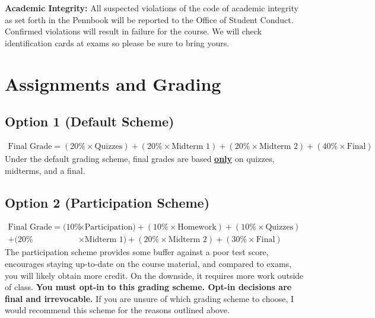 \documentclass[11pt, letterpaper]{article}
\begin{document}
\bigskip

\noindent \textbf{Academic Integrity: } 
All suspected violations of the code of academic integrity as set forth in the Pennbook will be reported to the Office of Student Conduct. 
Confirmed violations will result in failure for the course. 
We will check identification cards at exams so please be sure to bring yours.

\medskip

\section*{Assignments and Grading}
	\subsection*{Option 1 (Default Scheme)}
		\begin{align*}
		\text{Final Grade} = (20\% \times \text{Quizzes}) + (20\% \times \text{Midterm 1}) + 
		(20\% \times \text{Midterm 2}) + (40\% \times \text{Final})
		\end{align*}
	Under the default grading scheme, final grades are based \textbf{\underline{only}} on quizzes, midterms, and a final.

	\subsection*{Option 2 (Participation Scheme)}
		\begin{align*}
		\text{Final Grade} = (10\% &\times \text{Participation}) + (10\% \times \text{Homework}) + (10\% \times \text{Quizzes}) 
		\\
		+ (20\% &\times \text{Midterm 1}) + (20\% \times \text{Midterm 2}) + (30\% \times \text{Final})
		\end{align*}
	The participation scheme provides some buffer against a poor test score, encourages staying up-to-date on the course material, and compared to exams, you will likely obtain more credit. 
	On the downside, it requires more work outside of class. 
	\textbf{You must opt-in to this grading scheme. Opt-in decisions are final and irrevocable.} 
	If you are unsure of which grading scheme to choose, I would recommend this scheme for the reasons outlined above.

\medskip
\end{document}
